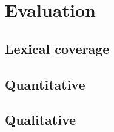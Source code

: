 \section{Evaluation}

\subsection{Lexical coverage}

\subsection{Quantitative}


\subsection{Qualitative}
